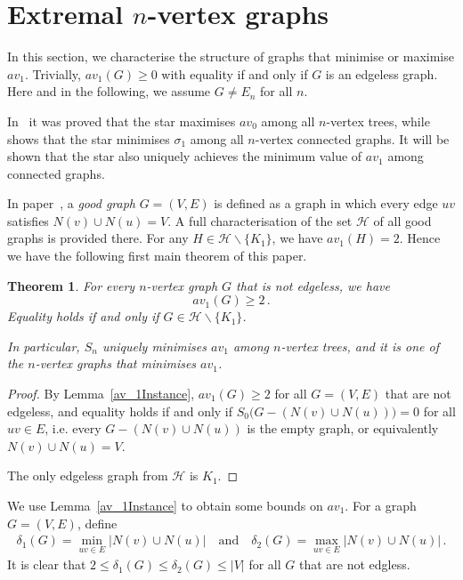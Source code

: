 \documentclass[a4paper,12pt]{amsart}
\newtheorem{theorem}[lemma]{Theorem}
\theoremstyle{remark}
\begin{document}
\section{Extremal $n$-vertex graphs} \label{Sect: extr}

In this section, we characterise the structure of graphs that minimise or maximise $av_1$.  Trivially, $av_1(G)\geq 0$ with equality if and only if $G$ is an edgeless graph. Here and in the following, we assume $G\neq E_n$ for all $n$.

In~\cite{andriantiana2018} it was proved that the star maximises $av_0$ among all $n$-vertex trees, while~\cite{shozi2024vertex} shows that the star minimises $\sigma_1$ among all $n$-vertex connected graphs. It will be shown that the star also uniquely achieves the minimum value of $av_1$ among connected graphs.  

\medskip
In paper~\cite{shozi2024vertex}, a {\it good graph} $G=(V,E)$ is defined as a graph in which every edge $uv$ satisfies $N(v) \cup N(u)=V$. A full characterisation of the set $\mathcal{H}$ of all good graphs is provided there. For any $H\in\mathcal{H}\smallsetminus\{K_1\}$, we have $av_1(H)=2$. Hence we have the following first main theorem of this paper.

\begin{theorem}\label{Thm:ngraph}
For every $n$-vertex graph $G$ that is not edgeless, we have $$av_1(G)\geq  2\,.$$ Equality holds if and only if $G \in \mathcal{H}\backslash \{ K_1 \}$.

In particular, $S_n$ uniquely minimises $av_1$ among $n$-vertex trees, and it is one of the $n$-vertex graphs that minimises $av_1$.
\end{theorem}

\begin{proof}
By Lemma~\ref{av_1Instance}, $av_1(G)\geq 2$ for all $G=(V,E)$ that are not edgeless, and equality holds if and only if $S_0\big(G-(N(v) \cup N(u))\big)=0$ for all $uv\in E$, i.e. every $G-(N(v) \cup N(u))$ is the empty graph, or equivalently $N(v) \cup N(u)=V$.

The only edgeless graph from $\mathcal{H}$ is $K_1$. %
\end{proof}

\medskip
We use Lemma~\ref{av_1Instance} to obtain some bounds on $av_1$. For a graph $G=(V,E)$, define
\begin{align*}
\delta_1(G)=\min_{uv\in E}|N(v) \cup N(u)|\quad \text{and} \quad \delta_2(G)=\max_{uv\in E}|N(v) \cup N(u)|\,.
\end{align*}
It is clear that $2\leq \delta_1(G)\leq \delta_2(G)\leq |V|$ for all $G$ that are not edgless.
\end{document}

